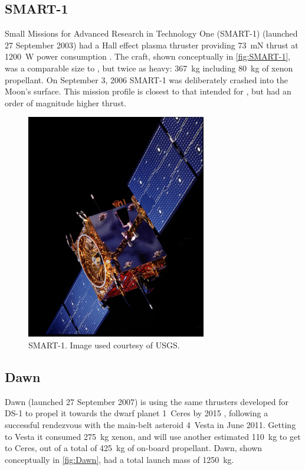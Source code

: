 \subsection{SMART-1}
Small Missions for Advanced Research in Technology One (SMART-1) (launched 27 September 2003) had a Hall effect plasma thruster providing 73~mN thrust at 1200~W power consumption \parencite{web_SMART-1}. The craft, shown conceptually in \autoref{fig:SMART-1}, was a comparable size to \BW, but twice as heavy: 367~kg including 80~kg of xenon propellant. On September 3, 2006 SMART-1 was deliberately crashed into the Moon's surface. This mission profile is closest to that intended for \BW, but had an order of magnitude higher thrust.

\begin{figure}[ht]
\caption{SMART-1. Image used courtesy of USGS.}
\label{fig:SMART-1}
\centering
\includegraphics [angle=90,width=0.7\textwidth] {Images/SMART-1.jpg}
\end{figure}

\subsection{Dawn}
Dawn (launched 27 September 2007) is using the same thrusters developed for DS-1 to propel it towards the dwarf planet 1~Ceres by 2015 \parencite{web_Dawn}, following a successful rendezvous with the main-belt asteroid 4~Vesta in June 2011. Getting to Vesta it consumed 275~kg xenon, and will use another estimated 110~kg to get to Ceres, out of a total of 425~kg of on-board propellant. Dawn, shown conceptually in \autoref{fig:Dawn}, had a total launch mass of 1250~kg.

